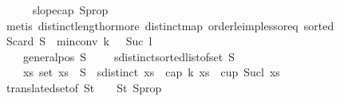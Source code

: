 \begin{isabellebody}
\ \ \ \ \isamarkupfalse%
\ slope{\isacharunderscore}{\kern0pt}cap{}\ S{}{\isacharunderscore}{\kern0pt}prop\isanewline
\ \ \ \ \isamarkupfalse%
\ {\isacharparenleft}{\kern0pt}metis\ distinct{\isacharunderscore}{\kern0pt}length{\isacharunderscore}{\kern0pt}{}{\isacharunderscore}{\kern0pt}or{\isacharunderscore}{\kern0pt}more\ distinct{\isacharunderscore}{\kern0pt}map\ order{\isacharunderscore}{\kern0pt}le{\isacharunderscore}{\kern0pt}imp{\isacharunderscore}{\kern0pt}less{\isacharunderscore}{\kern0pt}or{\isacharunderscore}{\kern0pt}eq\ sorted{}{\isacharparenright}{\kern0pt}\isanewline
\isanewline
\ \ \isamarkupfalse%
\ S{}{\isacharcolon}{\kern0pt}{\isachardoublequoteopen}card\ S{}\ {\isacharequal}{\kern0pt}\ min{\isacharunderscore}{\kern0pt}conv\ {\isacharparenleft}{\kern0pt}k\ {\isacharplus}{\kern0pt}\ {}{\isacharparenright}{\kern0pt}\ {\isacharparenleft}{\kern0pt}Suc\ {\isacharparenleft}{\kern0pt}l\ {\isacharplus}{\kern0pt}\ {}{\isacharparenright}{\kern0pt}{\isacharparenright}{\kern0pt}\ {\isacharminus}{\kern0pt}\ {}{\isachardoublequoteclose}\ \isanewline
\ \ \ \ {\isachardoublequoteopen}general{\isacharunderscore}{\kern0pt}pos\ S{}{\isachardoublequoteclose}\ \ \ \ \ {\isachardoublequoteopen}sdistinct{\isacharparenleft}{\kern0pt}sorted{\isacharunderscore}{\kern0pt}list{\isacharunderscore}{\kern0pt}of{\isacharunderscore}{\kern0pt}set\ S{}{\isacharparenright}{\kern0pt}{\isachardoublequoteclose}\isanewline
\ \ \ \ {\isachardoublequoteopen}{\isasymforall}xs{\isachardot}{\kern0pt}\ set\ xs\ {\isasymsubseteq}\ S{}\ {\isasymand}\ {\isacharparenleft}{\kern0pt}sdistinct\ xs{\isacharparenright}{\kern0pt}\ {\isasymlongrightarrow}\ {\isasymnot}{\isacharparenleft}{\kern0pt}cap\ {\isacharparenleft}{\kern0pt}k{\isacharplus}{\kern0pt}{}{\isacharparenright}{\kern0pt}\ xs\ {\isasymor}\ cup\ {\isacharparenleft}{\kern0pt}Suc{\isacharparenleft}{\kern0pt}l{\isacharplus}{\kern0pt}{}{\isacharparenright}{\kern0pt}{\isacharparenright}{\kern0pt}\ xs{\isacharparenright}{\kern0pt}{\isachardoublequoteclose}\isanewline
\ \ \ \ \isamarkupfalse%
\ translated{\isacharunderscore}{\kern0pt}set{\isacharbrackleft}{\kern0pt}of\ {\isachardoublequoteopen}S{}t{\isachardoublequoteclose}\ {\isacharunderscore}{\kern0pt}\ \ {\isacharbrackright}{\kern0pt}\ S{}t\ S{}{\isacharunderscore}{\kern0pt}prop{\isacharparenleft}{\kern0pt}{}{\isacharparenright}{\kern0pt}\ \isamarkupfalse%

\end{isabellebody}

